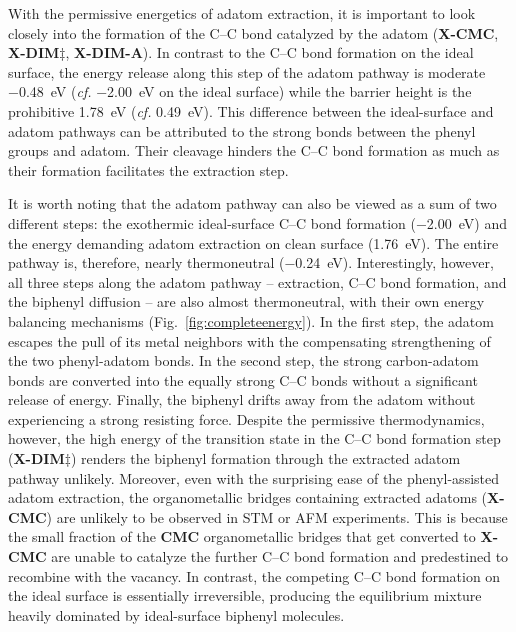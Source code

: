 \documentclass[aps,prb,amsmath,amssymb,11pt]{revtex4-1}
\begin{document}
With the permissive energetics of adatom extraction, it is important to look closely into the formation of the C--C bond catalyzed by the adatom (\textbf{X-CMC}, \textbf{X-DIM$\ddagger$}, \textbf{X-DIM-A}).
In contrast to the C--C bond formation on the ideal surface, the energy release along this step of the adatom pathway is moderate \SI{-0.48}{\electronvolt} (\textit{cf.} \SI{-2.00}{\electronvolt} on the ideal surface) while the barrier height is the prohibitive \SI{1.78}{\electronvolt} (\textit{cf.} \SI{0.49}{\electronvolt}). 
This difference between the ideal-surface and adatom pathways can be attributed to the strong bonds between the phenyl groups and adatom.
Their cleavage  hinders the C--C bond formation as much as their formation facilitates the extraction step.

It is worth noting that the adatom pathway can also be viewed as a sum of two different steps: the exothermic ideal-surface C--C bond formation (\SI{-2.00}{\electronvolt}) and the energy demanding adatom extraction on clean surface (\SI{1.76}{\electronvolt}). 
The entire pathway is, therefore, nearly thermoneutral (\SI{-0.24}{\electronvolt}). 
Interestingly, however, all three steps along the adatom pathway -- extraction, C--C bond
formation, and the biphenyl diffusion -- are also almost thermoneutral, with their own energy balancing mechanisms (Fig.~\ref{fig:completeenergy}). 
In the first step, the adatom escapes the pull of its metal neighbors with the compensating strengthening of the two phenyl-adatom bonds. In the second step, the strong carbon-adatom bonds are converted into the equally strong C--C bonds without a significant release of energy. Finally, the biphenyl drifts away from the adatom without experiencing a strong resisting force. Despite the permissive thermodynamics, however, the high energy of the transition state in the C--C bond formation step (\textbf{X-DIM$\ddagger$}) renders the biphenyl formation through the extracted adatom pathway unlikely.
Moreover, even with the surprising ease of the phenyl-assisted adatom extraction, the organometallic bridges containing extracted adatoms (\textbf{X-CMC}) are unlikely to be observed in STM or AFM experiments. This is because the small fraction of the \textbf{CMC} organometallic bridges that get converted to \textbf{X-CMC} are unable to catalyze the further C--C bond formation and predestined to recombine with the vacancy. In contrast, the competing C--C bond formation on the ideal surface is essentially irreversible, producing the equilibrium mixture heavily dominated by ideal-surface biphenyl molecules.
\end{document}
